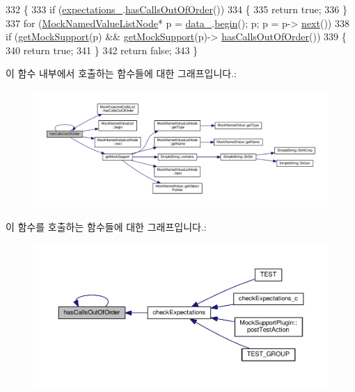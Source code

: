 \begin{DoxyCode}
332 \{
333     \textcolor{keywordflow}{if} (\hyperlink{class_mock_support_a8f02a0b866ff54bef3fb38cd8bc57fa2}{expectations\_}.\hyperlink{class_mock_expected_calls_list_a5fe56334ba5e10a4677844b62e7e69c4}{hasCallsOutOfOrder}())
334     \{
335         \textcolor{keywordflow}{return} \textcolor{keyword}{true};
336     \}
337     \textcolor{keywordflow}{for} (\hyperlink{class_mock_named_value_list_node}{MockNamedValueListNode}* p = \hyperlink{class_mock_support_a26b06d2d43a7804c9aa5808409c0c1ee}{data\_}.\hyperlink{class_mock_named_value_list_a4a5976d05542385eb64ea73eee7fc59c}{begin}(); p; p = p->
      \hyperlink{class_mock_named_value_list_node_adaf0ca3232d35f7efae1bade86b8027e}{next}())
338         \textcolor{keywordflow}{if} (\hyperlink{class_mock_support_a575951d416e49f54fd1a3fc4823609e3}{getMockSupport}(p) && \hyperlink{class_mock_support_a575951d416e49f54fd1a3fc4823609e3}{getMockSupport}(p)->
      \hyperlink{class_mock_support_aa89b3718eac29065f072462df28ed6c3}{hasCallsOutOfOrder}())
339         \{
340             \textcolor{keywordflow}{return} \textcolor{keyword}{true};
341         \}
342     \textcolor{keywordflow}{return} \textcolor{keyword}{false};
343 \}
\end{DoxyCode}


이 함수 내부에서 호출하는 함수들에 대한 그래프입니다.\+:
\nopagebreak
\begin{figure}[H]
\begin{center}
\leavevmode
\includegraphics[width=350pt]{class_mock_support_aa89b3718eac29065f072462df28ed6c3_cgraph}
\end{center}
\end{figure}




이 함수를 호출하는 함수들에 대한 그래프입니다.\+:
\nopagebreak
\begin{figure}[H]
\begin{center}
\leavevmode
\includegraphics[width=350pt]{class_mock_support_aa89b3718eac29065f072462df28ed6c3_icgraph}
\end{center}
\end{figure}


